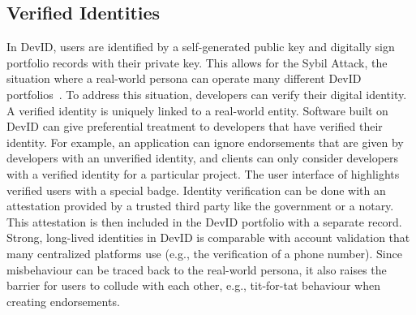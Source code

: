 \subsection{Verified Identities}
\label{subsec:strong_identities}
In DevID, users are identified by a self-generated public key and digitally sign portfolio records with their private key.
This allows for the Sybil Attack, the situation where a real-world persona can operate many different DevID portfolios~\cite{douceur2002sybil}.
To address this situation, developers can verify their digital identity.
A verified identity is uniquely linked to a real-world entity.
Software built on DevID can give preferential treatment to developers that have verified their identity.
For example, an application can ignore endorsements that are given by developers with an unverified identity, and clients can only consider developers with a verified identity for a particular project.
The user interface of \Dappcoder{} highlights verified users with a special badge.
Identity verification can be done with an attestation provided by a trusted third party like the government or a notary.
This attestation is then included in the DevID portfolio with a separate record.
Strong, long-lived identities in DevID is comparable with account validation that many centralized platforms use (e.g., the verification of a phone number).
Since misbehaviour can be traced back to the real-world persona, it also raises the barrier for users to collude with each other, e.g., tit-for-tat behaviour when creating endorsements.

